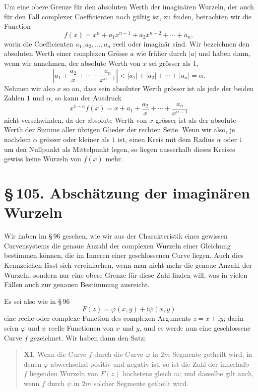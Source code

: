 \documentclass[11pt]{article}
\providecommand{\sect}[2]{\section*{\S\,#1. #2}}
\providecommand{\ii}{\mathrm{i}}
\begin{document}
Um eine obere Grenze für den absoluten Werth der imaginären Wurzeln, der auch für den Fall complexer Coefficienten noch gültig ist, zu finden, betrachten wir die Function
\[
        f(x)=x^n+a_1x^{n-1}+a_2x^{n-2}+\cdots+a_n,
\]
worin die Coefficienten $a_1,a_2,\ldots,a_n$ reell oder imaginär sind. Wir bezeichnen den absoluten Werth einer complexen Grösse $a$ wie früher durch $|a|$ und haben dann, wenn wir annehmen, der absolute Werth von $x$ sei grösser als $1$,
\[
        \left|a_1+\frac{a_2}{x}+\cdots+\frac{a_n}{x^{n-1}}\right|
        < |a_1|+|a_2|+\cdots+|a_n|=\alpha.
\]
Nehmen wir also $x$ so an, dass sein absoluter Werth grösser ist als jede der beiden Zahlen $1$ und $\alpha$, so kann der Ausdruck
\[
        x^{1-n}f(x)=x+a_1+\frac{a_2}{x}+\cdots+\frac{a_n}{x^{n-1}}
\]
nicht verschwinden, da der absolute Werth von $x$ grösser ist als der absolute Werth der Summe aller übrigen Glieder der rechten Seite. Wenn wir also, je nachdem $\alpha$ grösser oder kleiner als $1$ ist, einen Kreis mit dem Radius $\alpha$ oder $1$ um den Nullpunkt als Mittelpunkt legen, so liegen ausserhalb dieses Kreises gewiss keine Wurzeln von $f(x)$ mehr.

\sect{105}{Abschätzung der imaginären Wurzeln}

Wir haben im \S\,96 gesehen, wie wir aus der Charakteristik eines gewissen Curvensystems die genaue Anzahl der complexen Wurzeln einer Gleichung bestimmen können, die im Inneren einer geschlossenen Curve liegen. Auch dies Kennzeichen lässt sich vereinfachen, wenn man nicht mehr die genaue Anzahl der Wurzeln, sondern nur eine obere Grenze für diese Zahl finden will, was in vielen Fällen auch zur genauen Bestimmung ausreicht.

Es sei also wie in \S\,96
\begin{equation}
        F(z)=\varphi(x,y)+\ii\psi(x,y)
\tag{1}
\end{equation}
eine reelle oder complexe Function des complexen Arguments $z=x+\ii y$; darin seien $\varphi$ und $\psi$ reelle Functionen von $x$ und $y$, und es werde nun eine geschlossene Curve $f$ gezeichnet. Wir haben dann den Satz:

\begin{quote}
\textbf{XI.} Wenn die Curve $f$ durch die Curve $\varphi$ in $2m$ Segmente getheilt wird, in denen $\varphi$ abwechselnd positiv und negativ ist, so ist die Zahl der innerhalb $f$ liegenden Wurzeln von $F(z)$ höchstens gleich $m$; und dasselbe gilt auch, wenn $f$ durch $\psi$ in $2m$ solcher Segmente getheilt wird.
\end{quote}
\end{document}
